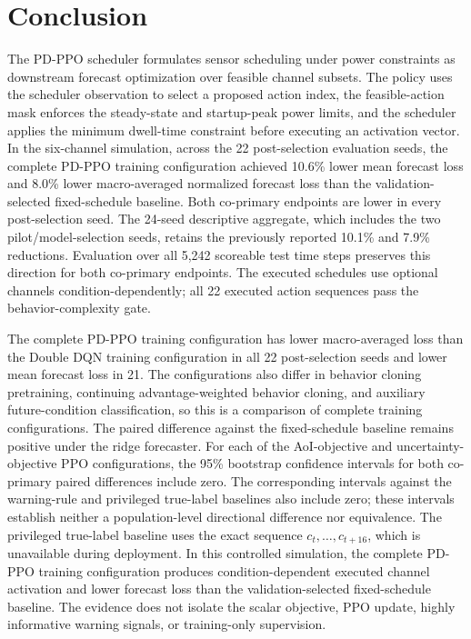 \section{Conclusion}

The PD-PPO scheduler formulates sensor scheduling under power constraints as
downstream forecast optimization over feasible channel subsets. The policy uses
the scheduler observation to select a proposed action index, the feasible-action
mask
enforces the steady-state and startup-peak power limits, and the scheduler
applies the minimum dwell-time constraint before executing an activation vector.
In the six-channel simulation, across the 22 post-selection evaluation seeds,
the complete PD-PPO training configuration achieved 10.6\% lower mean forecast
loss and 8.0\% lower macro-averaged normalized forecast loss than the
validation-selected fixed-schedule baseline. Both co-primary endpoints are lower
in every post-selection seed. The 24-seed descriptive
aggregate, which includes the two pilot/model-selection seeds, retains the
previously reported 10.1\% and 7.9\% reductions. Evaluation over all 5,242
scoreable test time steps preserves this direction for both co-primary
endpoints. The executed schedules use optional channels condition-dependently;
all 22 executed action sequences pass the behavior-complexity gate.

The complete PD-PPO training configuration has lower macro-averaged loss than
the Double DQN training configuration in all 22 post-selection seeds and lower
mean forecast loss in 21. The configurations also differ in behavior cloning
pretraining, continuing advantage-weighted behavior cloning, and auxiliary
future-condition classification, so this is a comparison of complete training
configurations. The paired difference against the fixed-schedule baseline
remains positive under the ridge forecaster. For each of the AoI-objective and
uncertainty-objective PPO configurations, the 95\% bootstrap confidence
intervals for both co-primary paired differences include zero. The corresponding
intervals against the warning-rule and privileged true-label baselines also
include zero; these intervals establish neither a population-level directional
difference nor equivalence. The privileged true-label baseline uses the exact
sequence $c_t,\ldots,c_{t+16}$, which is unavailable during deployment. In this
controlled simulation, the complete PD-PPO training configuration produces
condition-dependent executed channel activation and lower forecast loss than the
validation-selected fixed-schedule baseline. The evidence does not isolate the
scalar objective, PPO update, highly informative warning signals, or
training-only supervision.
